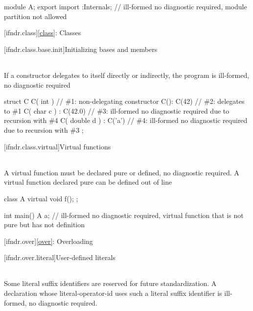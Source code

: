 \pnum
\begin{example}
\begin{codeblock}
module A;
export import :Internals;       // ill-formed no diagnostic required, module partition not allowed
\end{codeblock}
\end{example}


[ifndr.class]{\ref{class}: Classes}

[ifndr.class.base.init]{Initializing bases and members}

\pnum
{} \\
If a constructor delegates to itself directly or indirectly,
the program is ill-formed, no diagnostic required

\pnum
\begin{example}
\begin{codeblock}
struct C {
  C( int ) { }                  // \#1: non-delegating constructor
  C(): C(42) { }                // \#2: delegates to \#1
  C( char c ) : C(42.0) { }     // \#3: ill-formed no diagnostic required due to recursion with \#4
  C( double d ) : C('a') { }    // \#4: ill-formed no diagnostic required due to recursion with \#3
};
\end{codeblock}
\end{example}


[ifndr.class.virtual]{Virtual functions}

\pnum
{} \\
A virtual function must be declared pure or defined, no diagnostic required. A virtual function declared pure can be defined
out of line

\pnum
\begin{example}
\begin{codeblock}
class A {
  virtual void f();
};

int main() {
  A a;      // ill-formed no diagnostic required, virtual function that is not pure but has not definition
}
\end{codeblock}
\end{example}


[ifndr.over]{\ref{over}: Overloading}

[ifndr.over.literal]{User-defined literals}

\pnum
{} \\
Some literal suffix identifiers are
reserved for future standardization. A declaration whose literal-operator-id uses such a literal
suffix identifier is ill-formed, no diagnostic required.


